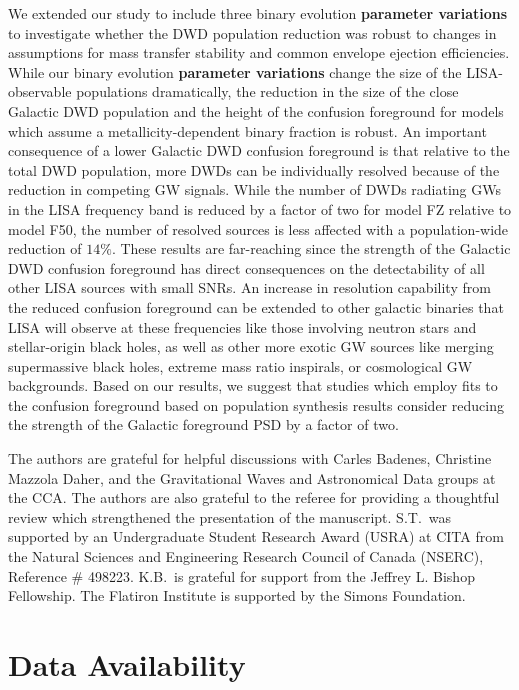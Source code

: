 \documentclass[twocolumn, linenumbers]{aastex631}
\begin{document}
We extended our study to include three binary evolution \textbf{parameter variations} to investigate whether the DWD population reduction was robust to changes in assumptions for mass transfer stability and common envelope ejection efficiencies. While our binary evolution \textbf{parameter variations} change the size of the LISA-observable populations dramatically, the reduction in the size of the close Galactic DWD population and the height of the confusion foreground for models which assume a metallicity-dependent binary fraction is robust. An important consequence of a lower Galactic DWD confusion foreground is that relative to the total DWD population, more DWDs can be individually resolved because of the reduction in competing GW signals. While the number of DWDs radiating GWs in the LISA frequency band is reduced by a factor of two for model FZ relative to model F50, the number of resolved sources is less affected with a population-wide reduction of $14\%$. These results are far-reaching since the strength of the Galactic DWD confusion foreground has direct consequences on the detectability of all other LISA sources with small SNRs. An increase in resolution capability from the reduced confusion foreground can be extended to other galactic binaries that LISA will observe at these frequencies like those involving neutron stars and stellar-origin black holes, as well as other more exotic GW sources like merging supermassive black holes, extreme mass ratio inspirals, or cosmological GW backgrounds. Based on our results, we suggest that studies which employ fits to the confusion foreground based on population synthesis results consider reducing the strength of the Galactic foreground PSD by a factor of two.


\begin{acknowledgments}
The authors are grateful for helpful discussions with Carles Badenes, Christine Mazzola Daher, and the Gravitational Waves and Astronomical Data groups at the CCA. The authors are also grateful to the referee for providing a thoughtful review which strengthened the presentation of the manuscript. S.T.\ was supported by an Undergraduate Student Research Award (USRA) at CITA from the Natural Sciences and Engineering Research Council of Canada (NSERC), Reference \# 498223. K.B.\ is grateful for support from the Jeffrey L. Bishop Fellowship. The Flatiron Institute is supported by the Simons Foundation.
\end{acknowledgments}

\section*{Data Availability}
\end{document}

